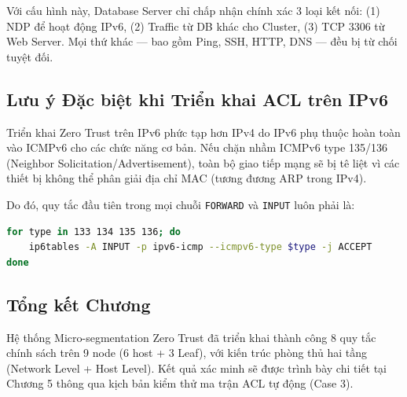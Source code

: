 Với cấu hình này, Database Server chỉ chấp nhận chính xác 3 loại kết nối: (1) NDP để hoạt động IPv6, (2) Traffic từ DB khác cho Cluster, (3) TCP 3306 từ Web Server. Mọi thứ khác — bao gồm Ping, SSH, HTTP, DNS — đều bị từ chối tuyệt đối.

\subsection{Lưu ý Đặc biệt khi Triển khai ACL trên IPv6}

Triển khai Zero Trust trên IPv6 phức tạp hơn IPv4 do IPv6 phụ thuộc hoàn toàn vào ICMPv6 cho các chức năng cơ bản. Nếu chặn nhầm ICMPv6 type 135/136 (Neighbor Solicitation/Advertisement), toàn bộ giao tiếp mạng sẽ bị tê liệt vì các thiết bị không thể phân giải địa chỉ MAC (tương đương ARP trong IPv4).

Do đó, quy tắc đầu tiên trong mọi chuỗi \texttt{FORWARD} và \texttt{INPUT} luôn phải là:
\begin{lstlisting}[style=customcode, language=bash, caption={NDP — Quy tắc bắt buộc đầu tiên trong mọi chuỗi ip6tables.}]
for type in 133 134 135 136; do
    ip6tables -A INPUT -p ipv6-icmp --icmpv6-type $type -j ACCEPT
done
\end{lstlisting}

\subsection{Tổng kết Chương}

Hệ thống Micro-segmentation Zero Trust đã triển khai thành công 8 quy tắc chính sách trên 9 node (6 host + 3 Leaf), với kiến trúc phòng thủ hai tầng (Network Level + Host Level). Kết quả xác minh sẽ được trình bày chi tiết tại Chương 5 thông qua kịch bản kiểm thử ma trận ACL tự động (Case 3).
